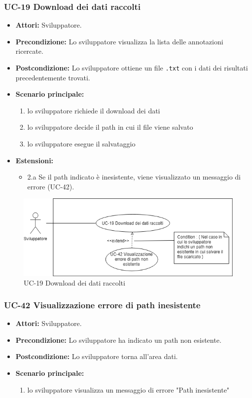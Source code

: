 	\subsubsection{UC-19 Download dei dati raccolti}
		\begin{itemize}
			\item \textbf{Attori:} Sviluppatore.
			\item \textbf{Precondizione:} Lo sviluppatore visualizza la lista delle annotazioni ricercate.
			\item \textbf{Postcondizione:} Lo sviluppatore ottiene un file \texttt{.txt} con i dati dei risultati precedentemente trovati.
			\item \textbf{Scenario principale:}
				\begin{enumerate}
					\item lo sviluppatore richiede il download dei dati
					\item lo sviluppatore decide il path in cui il file viene salvato
					\item lo sviluppatore esegue il salvataggio
				\end{enumerate}
			\item \textbf{Estensioni:}
				\begin{itemize}
					\item 2.a Se il path indicato è inesistente, viene visualizzato un messaggio di errore (UC-42).
				\end{itemize}
		\end{itemize}
		\begin{figure}[h]
			\centering
			\includegraphics[scale=0.7]{images/UC-19.png}
			\caption{UC-19 Download dei dati raccolti}
		\end{figure}	

	\subsubsection{UC-42 Visualizzazione errore di path inesistente}
		\begin{itemize}					
			\item \textbf{Attori:} Sviluppatore.
			\item \textbf{Precondizione:} Lo sviluppatore ha indicato un path non esistente.
			\item \textbf{Postcondizione:} Lo sviluppatore torna all'area dati.
			\item \textbf{Scenario principale:}
				\begin{enumerate}
					\item lo sviluppatore visualizza un messaggio di errore "Path inesistente"
				\end{enumerate}	
		\end{itemize}				
				
